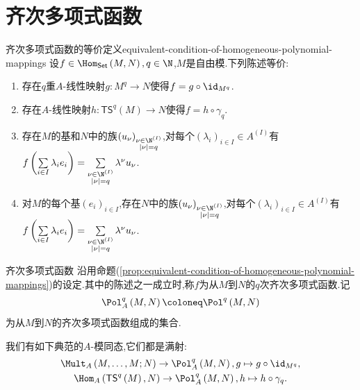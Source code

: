 \section{齐次多项式函数}

\begin{proposition}{齐次多项式函数的等价定义}{equivalent-condition-of-homogeneous-polynomial-mappings}
	设$f\in\Hom_{\mathsf{Set}}\left(M,N\right),q\in\N$,$M$是自由模.下列陈述等价:
	\begin{enumerate}
		\item 存在$q$重$A$-线性映射$g:M^{q}\to N$使得$f=g\circ\id_{M^{q}}$.
		\item 存在$A$-线性映射$h:\mathsf{TS}^{q}\left(M\right)\to N$使得$f=h\circ\gamma_{q}$.
		\item 存在$M$的基和$N$中的族$\left(u_{\nu}\right)_{\substack{\nu\in\N^{\left(I\right)}\\ \left|\nu\right|=q}}$,对每个$\left(\lambda_{i}\right)_{i\in I}\in A^{\left(I\right)}$有$	f\left(\sum\limits_{i\in I}\lambda_{i}e_{i}\right)=\sum\limits_{\substack{\nu\in\N^{\left(I\right)}\\ \left|\nu\right|=q}}\lambda^{\nu}u_{\nu}$.
		\item 对$M$的每个基$\left(e_{i}\right)_{i\in I}$,存在$N$中的族$\left(u_{\nu}\right)_{\substack{\nu\in\N^{\left(I\right)}\\ \left|\nu\right|=q}}$,对每个$\left(\lambda_{i}\right)_{i\in I}\in A^{\left(I\right)}$有$f\left(\sum\limits_{i\in I}\lambda_{i}e_{i}\right)=\sum\limits_{\substack{\nu\in\N^{\left(I\right)}\\ \left|\nu\right|=q}}\lambda^{\nu}u_{\nu}$.
	\end{enumerate}
\end{proposition}

\begin{definition}{齐次多项式函数}{}
	沿用命题(\ref{prop:equivalent-condition-of-homogeneous-polynomial-mappings})的设定.其中的陈述之一成立时,称$f$为从$M$到$N$的$q$次齐次多项式函数.记
	\begin{align*}
		\Pol_{A}^{q}\left(M,N\right)\coloneq\Pol^{q}\left(M,N\right)
	\end{align*}
	为从$M$到$N$的齐次多项式函数组成的集合.
\end{definition}

\begin{remark}{}{}
	我们有如下典范的$A$-模同态,它们都是满射:
	\begin{gather*}
		\Mult_{A}\left(M,\ldots,M;N\right)\to\Pol_{A}^{q}\left(M,N\right),g\mapsto g\circ\id_{M^{q}},\\
		\Hom_{A}\left(\mathsf{TS}^{q}\left(M\right),N\right)\to\Pol_{A}^{q}\left(M,N\right),h\mapsto h\circ\gamma_{q}.
	\end{gather*}
\end{remark}


